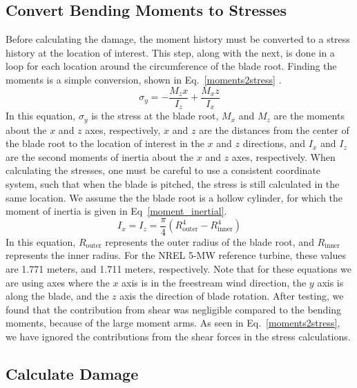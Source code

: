 \documentclass[11pt,letterpaper]{article}
\begin{document}
\subsection{Convert Bending Moments to Stresses}
Before calculating the damage, the moment history must be converted to a stress history at the location of interest. This step, along with the next, is done in a loop for each location around the circumference of the blade root. Finding the moments is a simple conversion, shown in Eq.~\ref{moments2stress} \cite{budynas2020shigley}.
% 
\begin{equation}
    \sigma_y = -\frac{M_z x}{I_z} + \frac{M_x z}{I_x}
    \label{moments2stress}
\end{equation}
% 
In this equation, $\sigma_y$ is the stress at the blade root, $M_x$ and $M_z$ are the moments about the $x$ and $z$ axes, respectively, $x$ and $z$ are the distances from the center of the blade root to the location of interest in the $x$ and $z$ directions, and $I_x$ and $I_z$ are the second moments of inertia about the $x$ and $z$ axes, respectively. When calculating the stresses, one must be careful to use a consistent coordinate system, such that when the blade is pitched, the stress is still calculated in the same location. We assume the the blade root is a hollow cylinder, for which the moment of inertia is given in Eq~\ref{moment_inertial}.
% 
\begin{equation}
    I_x = I_z = \frac{\pi}{4} (R_\text{outer}^4 - R_\text{inner}^4)
    \label{moment_inertial}
\end{equation}
% 
In this equation, $R_\text{outer}$ represents the outer radius of the blade root, and $R_\text{inner}$ represents the inner radius. For the NREL 5-MW reference turbine, these values are 1.771 meters, and 1.711 meters, respectively. Note that for these equations we are using axes where the $x$ axis is in the freestream wind direction, the $y$ axis is along the blade, and the $z$ axis the direction of blade rotation. After testing, we found that the contribution from shear was negligible compared to the bending moments, because of the large moment arms. As seen in Eq.~\ref{moments2stress}, we have ignored the contributions from the shear forces in the stress calculations. 


\subsection{Calculate Damage}
\end{document}
